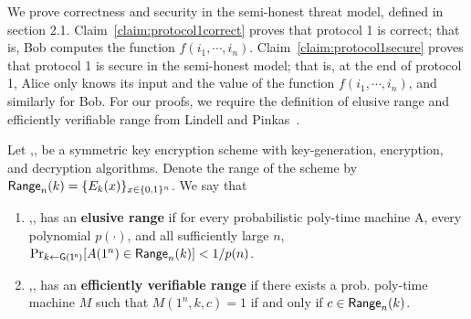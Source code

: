 We prove correctness and security in the semi-honest threat model,
defined in section 2.1.  Claim~\ref{claim:protocol1correct}
proves that protocol 1 is
correct; that is, Bob computes the function $f(i_1,\cdots,i_n)$.
Claim~\ref{claim:protocol1secure} proves that protocol 1 is secure
in the semi-honest model; that is, at the end of protocol 1, Alice only
knows its input and the value of the function $f(i_1,\cdots,i_n)$, and
similarly for Bob. For our proofs, we require the definition of elusive range and
efficiently verifiable range from Lindell and Pinkas~\cite{LP04}.
\begin{definition}
Let ,, be a symmetric key encryption scheme
with key-generation, encryption, and decryption algorithms.
Denote the range of the scheme by
$\mathsf{Range}_n(k)=\{E_k(x)\}_{x\in\{0,1\}^n}$. We say that
\begin{enumerate}
	\item {},, has an \textbf{elusive range}
	if for every probabilistic poly-time machine A, every
	polynomial $p(\cdot)$, and all sufficiently large $n$,
	$\Pr_{k{\gets}\mathsf{G(1^n)}}[A(1^n)\in\mathsf{Range}_n(k)]<1/p(n)$.

	\item {},, has an \textbf{efficiently
	verifiable range} if there exists a prob. poly-time
	machine $M$ such that $M(1^n,k,c)=1$ if and only if
	$c\in\mathsf{Range}_n(k)$.
\end{enumerate}
\end{definition}

